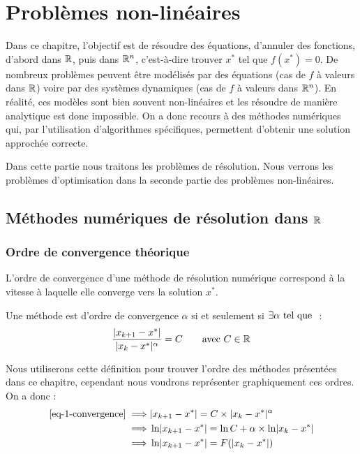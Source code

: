 \chapter{Problèmes non-linéaires}
\label{ch-1}


	Dans ce chapitre, l'objectif est de résoudre des équations, d'annuler des fonctions, d'abord dans $\mathbb{R}$, puis dans $\mathbb{R}^n$, c'est-à-dire trouver $x^*$ tel que $f(x^*)=0$.
	De nombreux problèmes peuvent être modélisés par des équations (cas de $f$ à valeurs dans $\mathbb{R}$) voire par des systèmes dynamiques (cas de $f$ à valeurs dans $\mathbb{R}^n$). En réalité, ces modèles sont bien souvent non-linéaires et les résoudre de manière analytique est donc impossible. On a donc recours à des méthodes numériques qui, par l'utilisation d'algorithmes spécifiques, permettent d'obtenir une solution approchée correcte.
	
	Dans cette partie nous traitons les problèmes de résolution. Nous verrons les problèmes d'optimisation dans la seconde partie des problèmes non-linéaires.

\section{Méthodes numériques de résolution dans \texorpdfstring{$\mathbb{R}$}{R}}

	\subsection{Ordre de convergence théorique}

		L'ordre de convergence d'une méthode de résolution numérique correspond à la vitesse à laquelle elle converge vers la solution $x^*$.

		\begin{definition}
			\label{def-1-convergence}
			Une méthode est d'ordre de convergence $\alpha$ si et seulement si $\exists \alpha \text{ tel que }$ :
			\begin{equation}
				\label{eq-1-convergence}
				\frac{\lvert x_{k+1} - x^* \rvert}{\lvert x_k - x^* \rvert^\alpha} = C \qquad \text{avec } C \in \mathbb{R}
			\end{equation}
		\end{definition}

		Nous utiliserons cette définition pour trouver l'ordre des méthodes présentées dans ce chapitre, cependant nous voudrons représenter graphiquement ces ordres. On a donc :
		\begin{align*}
			\eqref{eq-1-convergence}
			\implies & \lvert x_{k+1} - x^* \rvert = C \times \lvert x_k - x^* \rvert^\alpha				\\
			\implies & \ln \lvert x_{k+1} - x^* \rvert = \ln C + \alpha \times \ln \lvert x_k - x^* \rvert	\\
			\implies & \ln \lvert x_{k+1} - x^* \rvert = F(\lvert x_k - x^* \rvert)
		\end{align*}

